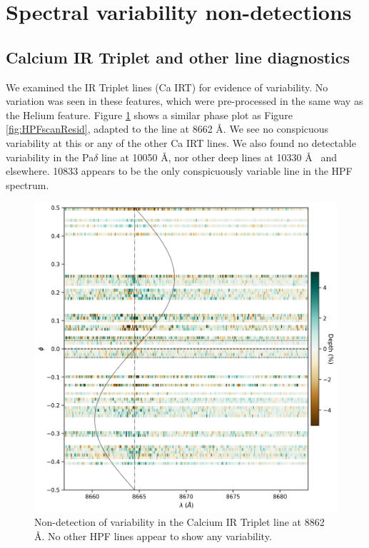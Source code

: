 \documentclass[linenumbers, twocolumn, trackchanges]{aastex631}
\begin{document}
\appendix

\section{Spectral variability non-detections} \label{appendixSec}
\subsection{Calcium IR Triplet and other line diagnostics}
We examined the  IR Triplet lines (Ca IRT) for evidence of variability.  No variation was seen in these features, which were pre-processed in the same way as the Helium feature.  Figure \ref{fig:CaPhaseScan} shows a similar phase plot as Figure \ref{fig:HPFscanResid}, adapted to the line at 8662 \AA.  We see no conspicuous variability at this or any of the other Ca IRT lines.  We also found no detectable variability in the Pa$\delta$ line at 10050 \AA, nor other deep lines at 10330 \AA~ and elsewhere.   10833 appears to be the only conspicuously variable line in the HPF spectrum.

\begin{figure}
  \includegraphics[width=0.5\linewidth]{Ca8662_phase_2D_diagram_resid.png}
  \caption{Non-detection of variability in the Calcium IR Triplet line at 8862 \AA.  No other HPF lines appear to show any variability.}
  \label{fig:CaPhaseScan}
\end{figure}
\end{document}
